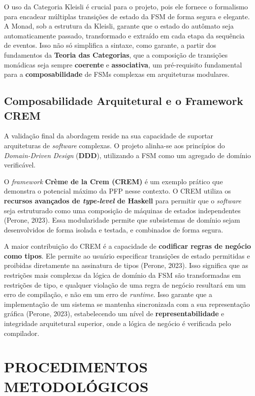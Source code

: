 \documentclass[12pt,a4paper]{article}
\begin{document}
O uso da Categoria Kleisli é crucial para o projeto, pois ele fornece o formalismo para encadear múltiplas transições de estado da FSM de forma segura e elegante. A Monad, sob a estrutura da Kleisli, garante que o estado do autômato seja automaticamente passado, transformado e extraído em cada etapa da sequência de eventos. Isso não só simplifica a sintaxe, como garante, a partir dos fundamentos da \textbf{Teoria das Categorias}, que a composição de transições monádicas seja sempre \textbf{coerente} e \textbf{associativa}, um pré-requisito fundamental para a \textbf{composabilidade} de FSMs complexas em arquiteturas modulares.

\subsection{Composabilidade Arquitetural e o Framework CREM}

A validação final da abordagem reside na sua capacidade de suportar arquiteturas de \textit{software} complexas. O projeto alinha-se aos princípios do \textit{Domain-Driven Design} (\textbf{DDD}), utilizando a FSM como um agregado de domínio verificável.

O \textit{framework} \textbf{Crème de la Crem (CREM)} é um exemplo prático que demonstra o potencial máximo da PFP nesse contexto. O CREM utiliza os \textbf{recursos avançados de \textit{type-level} de Haskell} para permitir que o \textit{software} seja estruturado como uma composição de máquinas de estados independentes (Perone, 2023). Essa modularidade permite que subsistemas de domínio sejam desenvolvidos de forma isolada e testada, e combinados de forma segura.

A maior contribuição do CREM é a capacidade de \textbf{codificar regras de negócio como tipos}. Ele permite ao usuário especificar transições de estado permitidas e proibidas diretamente na assinatura de tipos (Perone, 2023). Isso significa que as restrições mais complexas da lógica de domínio da FSM são transformadas em restrições de tipo, e qualquer violação de uma regra de negócio resultará em um erro de compilação, e não em um erro de \textit{runtime}. Isso garante que a implementação de um sistema se mantenha sincronizada com a sua representação gráfica (Perone, 2023), estabelecendo um nível de \textbf{representabilidade} e integridade arquitetural superior, onde a lógica de negócio é verificada pelo compilador.

\section{PROCEDIMENTOS METODOLÓGICOS}
\end{document}
